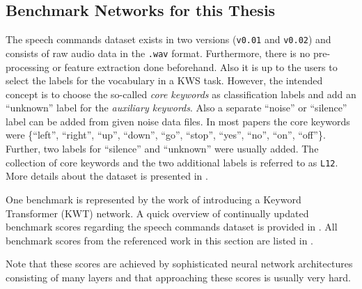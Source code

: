 \subsection{Benchmark Networks for this Thesis}\label{sec:prev_kws_benchmark}
The speech commands dataset \cite{Warden2018SpeechCommands} exists in two versions (\texttt{v0.01} and \texttt{v0.02}) and consists of raw audio data in the \texttt{.wav} format.
Furthermore, there is no pre-processing or feature extraction done beforehand.
Also it is up to the users to select the labels for the vocabulary in a KWS task.
However, the intended concept is to choose the so-called \emph{core keywords} as classification labels and add an \enquote{unknown} label for the \emph{auxiliary keywords}.
Also a separate \enquote{noise} or \enquote{silence} label can be added from given noise data files.
In most papers the core keywords were \{\enquote{left},  \enquote{right}, \enquote{up}, \enquote{down}, \enquote{go}, \enquote{stop}, \enquote{yes}, \enquote{no}, \enquote{on}, \enquote{off}\}.
Further, two labels for \enquote{silence} and \enquote{unknown} were usually added.
The collection of core keywords and the two additional labels is referred to as \texttt{L12}.
More details about the dataset is presented in .

One benchmark is represented by the work of \cite{Berg2021KeywordTransformer} introducing a Keyword Transformer (KWT) network.
A quick overview of continually updated benchmark scores regarding the speech commands dataset is provided in \cite{PaperswithcodeKWS}.
All benchmark scores from the referenced work in this section are listed in .

Note that these scores are achieved by sophisticated neural network architectures consisting of many layers and that approaching these scores is usually very hard.